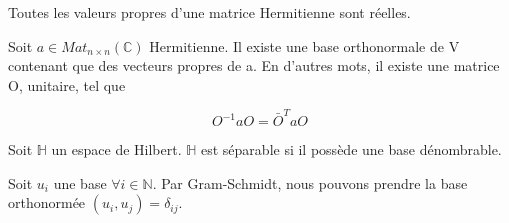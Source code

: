 \documentclass[../notesdecours.tex]{subfiles}
\begin{document}
\begin{lemma} Toutes les valeurs propres d'une matrice Hermitienne sont réelles. \end{lemma}


\begin{theorem} Soit $a \in Mat_{n \times n} (\mathbb{C})$ Hermitienne. Il existe une base orthonormale de V contenant que des vecteurs propres de a. En d'autres mots, il existe une matrice O, unitaire, tel que

\begin{equation}
O^{-1}aO = \bar{O}^TaO
\end{equation}
\end{theorem}

\begin{definition}
Soit $\mathbb{H}$ un espace de Hilbert. $\mathbb{H}$ est séparable si il possède une base dénombrable. 
\end{definition}

\begin{remark}
Soit $u_i$ une base $\forall i\in\mathbb{N}$. Par Gram-Schmidt, nous pouvons prendre la base orthonormée $(u_i,u_j) = \delta_{ij}$.
\end{remark}
\end{document}
